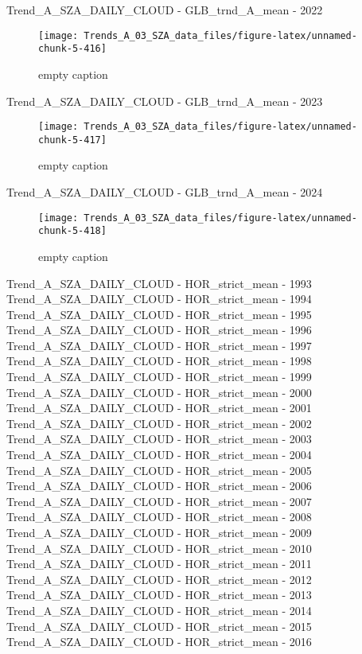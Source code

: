 \documentclass[
  10pt,
  a4paper,oneside]{article}
\begin{document}
Trend\_A\_SZA\_DAILY\_CLOUD - GLB\_trnd\_A\_mean - 2022

\begin{figure}[!ht]

{\centering \texttt{[image: Trends\_A\_03\_SZA\_data\_files/figure-latex/unnamed-chunk-5-416]} 

}

\caption{ empty caption }\label{fig:unnamed-chunk-5-416}
\end{figure}

Trend\_A\_SZA\_DAILY\_CLOUD - GLB\_trnd\_A\_mean - 2023

\begin{figure}[!ht]

{\centering \texttt{[image: Trends\_A\_03\_SZA\_data\_files/figure-latex/unnamed-chunk-5-417]} 

}

\caption{ empty caption }\label{fig:unnamed-chunk-5-417}
\end{figure}

Trend\_A\_SZA\_DAILY\_CLOUD - GLB\_trnd\_A\_mean - 2024

\begin{figure}[!ht]

{\centering \texttt{[image: Trends\_A\_03\_SZA\_data\_files/figure-latex/unnamed-chunk-5-418]} 

}

\caption{ empty caption }\label{fig:unnamed-chunk-5-418}
\end{figure}

Trend\_A\_SZA\_DAILY\_CLOUD - HOR\_strict\_mean - 1993
Trend\_A\_SZA\_DAILY\_CLOUD - HOR\_strict\_mean - 1994
Trend\_A\_SZA\_DAILY\_CLOUD - HOR\_strict\_mean - 1995
Trend\_A\_SZA\_DAILY\_CLOUD - HOR\_strict\_mean - 1996
Trend\_A\_SZA\_DAILY\_CLOUD - HOR\_strict\_mean - 1997
Trend\_A\_SZA\_DAILY\_CLOUD - HOR\_strict\_mean - 1998
Trend\_A\_SZA\_DAILY\_CLOUD - HOR\_strict\_mean - 1999
Trend\_A\_SZA\_DAILY\_CLOUD - HOR\_strict\_mean - 2000
Trend\_A\_SZA\_DAILY\_CLOUD - HOR\_strict\_mean - 2001
Trend\_A\_SZA\_DAILY\_CLOUD - HOR\_strict\_mean - 2002
Trend\_A\_SZA\_DAILY\_CLOUD - HOR\_strict\_mean - 2003
Trend\_A\_SZA\_DAILY\_CLOUD - HOR\_strict\_mean - 2004
Trend\_A\_SZA\_DAILY\_CLOUD - HOR\_strict\_mean - 2005
Trend\_A\_SZA\_DAILY\_CLOUD - HOR\_strict\_mean - 2006
Trend\_A\_SZA\_DAILY\_CLOUD - HOR\_strict\_mean - 2007
Trend\_A\_SZA\_DAILY\_CLOUD - HOR\_strict\_mean - 2008
Trend\_A\_SZA\_DAILY\_CLOUD - HOR\_strict\_mean - 2009
Trend\_A\_SZA\_DAILY\_CLOUD - HOR\_strict\_mean - 2010
Trend\_A\_SZA\_DAILY\_CLOUD - HOR\_strict\_mean - 2011
Trend\_A\_SZA\_DAILY\_CLOUD - HOR\_strict\_mean - 2012
Trend\_A\_SZA\_DAILY\_CLOUD - HOR\_strict\_mean - 2013
Trend\_A\_SZA\_DAILY\_CLOUD - HOR\_strict\_mean - 2014
Trend\_A\_SZA\_DAILY\_CLOUD - HOR\_strict\_mean - 2015
Trend\_A\_SZA\_DAILY\_CLOUD - HOR\_strict\_mean - 2016
\end{document}
